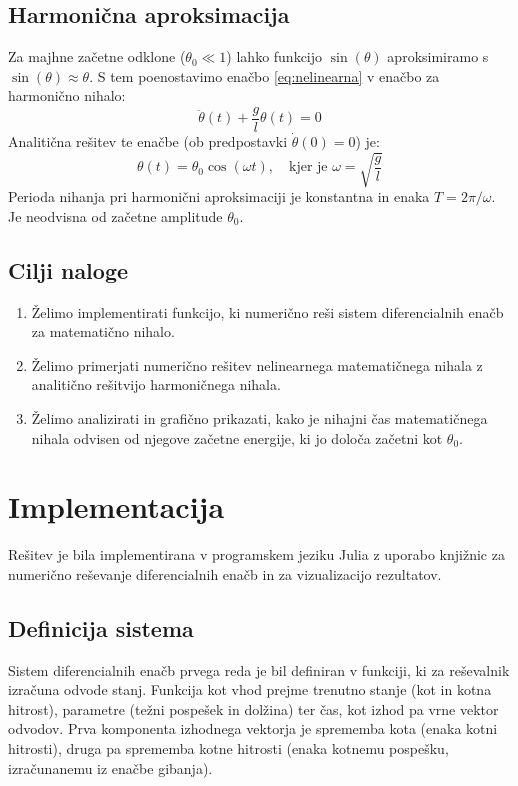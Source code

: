 \documentclass{article}
\begin{document}
\subsection{Harmonična aproksimacija}
Za majhne začetne odklone ($\theta_0 \ll 1$) lahko funkcijo $\sin(\theta)$ aproksimiramo s 
$\sin(\theta) \approx \theta$. S tem poenostavimo enačbo \ref{eq:nelinearna} v enačbo za harmonično nihalo:
\begin{equation}
\ddot{\theta}(t) + \frac{g}{l} \theta(t) = 0
\label{eq:linearna}
\end{equation}
Analitična rešitev te enačbe (ob predpostavki $\dot{\theta}(0) = 0$) je:
\begin{equation}
\theta(t) = \theta_0 \cos(\omega t), \quad \text{kjer je } \omega = \sqrt{\frac{g}{l}}
\end{equation}
Perioda nihanja pri harmonični aproksimaciji je konstantna in enaka $T = 2\pi/\omega$. Je neodvisna 
od začetne amplitude $\theta_0$.

\subsection{Cilji naloge}
\begin{enumerate}
    \item Želimo implementirati funkcijo, ki numerično reši sistem diferencialnih enačb za 
    matematično nihalo.
    \item Želimo primerjati numerično rešitev nelinearnega matematičnega nihala 
    z analitično rešitvijo harmoničnega nihala.
    \item Želimo analizirati in grafično prikazati, kako je nihajni čas 
    matematičnega nihala odvisen od njegove začetne energije, ki jo določa začetni kot $\theta_0$.
\end{enumerate}


\section{Implementacija}

Rešitev je bila implementirana v programskem jeziku Julia z uporabo knjižnic za
numerično reševanje diferencialnih enačb in za vizualizacijo rezultatov.

\subsection{Definicija sistema}
Sistem diferencialnih enačb prvega reda je bil definiran v funkciji, ki za reševalnik
izračuna odvode stanj. Funkcija kot vhod prejme trenutno stanje (kot in kotna hitrost),
parametre (težni pospešek in dolžina) ter čas, kot izhod pa vrne vektor odvodov. Prva
komponenta izhodnega vektorja je sprememba kota (enaka kotni hitrosti), druga pa sprememba
kotne hitrosti (enaka kotnemu pospešku, izračunanemu iz enačbe gibanja).
\end{document}
